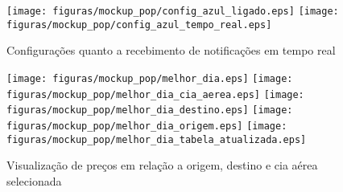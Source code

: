 		\begin{figure}[h]
			\centering
				\texttt{[image: figuras/mockup\_pop/config\_azul\_ligado.eps]}
				\texttt{[image: figuras/mockup\_pop/config\_azul\_tempo\_real.eps]}
			\caption{Configurações quanto a recebimento de notificações em tempo real}
			\label{fig:}
		\end{figure}
\begin{comment}
		\begin{figure}[h]
			\centering
				\texttt{[image: figuras/mockup\_pop/config\_limite\_max\_apertar.eps]}
				\texttt{[image: figuras/mockup\_pop/config\_max\_p1.eps]}
				\texttt{[image: figuras/mockup\_pop/config\_max\_p2.eps]}
				\texttt{[image: figuras/mockup\_pop/config\_max\_p3.eps]}
				\texttt{[image: figuras/mockup\_pop/config\_min\_p1.eps]}
				\texttt{[image: figuras/mockup\_pop/config\_min\_p2.eps]}
				\texttt{[image: figuras/mockup\_pop/config\_min\_p3.eps]}
			\caption{Configuração quanto a recebimento de notificações em limite de preços}
			\label{fig:}
		\end{figure}

		\begin{figure}[h]
			\centering
				\texttt{[image: figuras/mockup\_pop/historico.eps]}
				\texttt{[image: figuras/mockup\_pop/historico\_btn\_grafico.eps]}
				\texttt{[image: figuras/mockup\_pop/grafico.eps]}
			\caption{Visualização do histórico}
			\label{fig:}
		\end{figure}

		\begin{figure}[h]
			\centering
				\texttt{[image: figuras/mockup\_pop/menu\_lateral.eps]}
			\caption{Visualização do menu lateral}
			\label{fig:}
		\end{figure}
\end{comment}

		\begin{figure}[h]
			\centering
				\texttt{[image: figuras/mockup\_pop/melhor\_dia.eps]}
				\texttt{[image: figuras/mockup\_pop/melhor\_dia\_cia\_aerea.eps]}
				\texttt{[image: figuras/mockup\_pop/melhor\_dia\_destino.eps]}
				\texttt{[image: figuras/mockup\_pop/melhor\_dia\_origem.eps]}
				\texttt{[image: figuras/mockup\_pop/melhor\_dia\_tabela\_atualizada.eps]}
			\caption{Visualização de preços em relação a origem, destino e cia aérea selecionada}
			\label{fig:}
		\end{figure}

